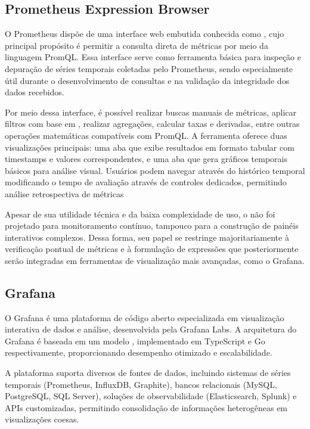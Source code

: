 \subsection{Prometheus Expression Browser}
\label{subsection:PrometheusExpressionBrowser}

O Prometheus dispõe de uma interface web embutida conhecida como  \citep{promexpbrwsr2025}, cujo principal propósito é permitir a consulta direta de métricas por meio da linguagem PromQL. Essa interface serve como ferramenta básica para inspeção e depuração de séries temporais coletadas pelo Prometheus, sendo especialmente útil durante o desenvolvimento de consultas e na validação da integridade dos dados recebidos.

Por meio dessa interface, é possível realizar buscas manuais de métricas, aplicar filtros com base em , realizar agregações, calcular taxas e derivadas, entre outras operações matemáticas compatíveis com PromQL. A ferramenta oferece duas visualizações principais: uma aba  que exibe resultados em formato tabular com timestamps e valores correspondentes, e uma aba  que gera gráficos temporais básicos para análise visual. Usuários podem navegar através do histórico temporal modificando o tempo de avaliação através de controles dedicados, permitindo análise retrospectiva de métricas

Apesar de sua utilidade técnica e da baixa complexidade de uso, o  não foi projetado para monitoramento contínuo, tampouco para a construção de painéis interativos complexos. Dessa forma, seu papel se restringe majoritariamente à verificação pontual de métricas e à formulação de expressões que posteriormente serão integradas em ferramentas de visualização mais avançadas, como o Grafana.

\subsection{Grafana}
\label{subsection:Grafana}

O Grafana \citep{grafana2025} é uma plataforma de código aberto especializada em visualização interativa de dados e análise, desenvolvida pela Grafana Labs. A arquitetura do Grafana é baseada em um modelo , implementado em TypeScript e Go respectivamente, proporcionando desempenho otimizado e escalabilidade.

A plataforma suporta diversos  de fontes de dados, incluindo sistemas de séries temporais (Prometheus, InfluxDB, Graphite), bancos relacionais (MySQL, PostgreSQL, SQL Server), soluções de observabilidade (Elasticsearch, Splunk) e APIs customizadas, permitindo consolidação de informações heterogêneas em visualizações coesas.

